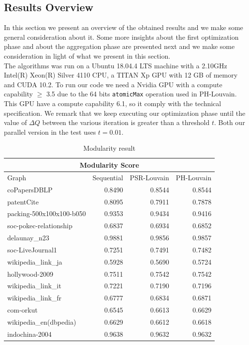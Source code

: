 \subsection{Results Overview}
In this section we present an overview of the obtained results and we make some general consideration about it. Some more insights about the first optimization phase and about the aggregation phase are presented next and we make some consideration in light of what we present in this section.\\ 
The algorithms was run on a Ubuntu 18.04.4 LTS machine with a 2.10GHz  Intel(R) Xeon(R) Silver 4110 CPU, a TITAN Xp GPU with 12 GB of memory and CUDA 10.2. To run our code we need a Nvidia GPU with a compute capability $\geq$ 3.5 due to the 64 bits \verb|atomicMax| operation used in PH-Louvain. This GPU have a compute capability 6.1, so it comply with the technical specification.
We remark that we keep executing our optimization phase until the value of $\Delta Q$ between the various iteration is greater than a threshold $t$. Both our parallel version in the test uses $t = 0.01$.\\
\begin{table}[h]
	\centering
	\begin{tabular}{ |l||r||r|r|}
		\hline
		\multicolumn{4}{|c|}{Modularity Score} \\
		\hline
		Graph & Sequential & PSR-Louvain & PH-Louvain \\
		\hline
		coPapersDBLP 			& 0.8490 & 0.8544 & 0.8544 \\
		patentCite 				& 0.8095 & 0.7911 & 0.7878 \\
		packing-500x100x100-b050& 0.9353 & 0.9434 & 0.9416 \\
		soc-pokec-relationship	& 0.6837 & 0.6934 & 0.6852 \\ 
		delaunay\_n23 			& 0.9881 & 0.9856 & 0.9857 \\
		soc-LiveJournal1 		& 0.7251 & 0.7491 & 0.7482 \\
		wikipedia\_link\_ja 	& 0.5928 & 0.5690 & 0.5724 \\
		hollywood-2009 			& 0.7511 & 0.7542 & 0.7542 \\
		wikipedia\_link\_it 	& 0.7221 & 0.7190 & 0.7196 \\
		wikipedia\_link\_fr 	& 0.6777 & 0.6834 & 0.6871 \\
		com-orkut 				& 0.6545 & 0.6613 & 0.6629 \\
		wikipedia\_en(dbpedia) 	& 0.6629 & 0.6612 & 0.6618 \\
		indochina-2004 			& 0.9638 & 0.9632 & 0.9632 \\
		\hline
	\end{tabular}
	\caption{\label{tab:mod}Modularity result}
\end{table} \\
